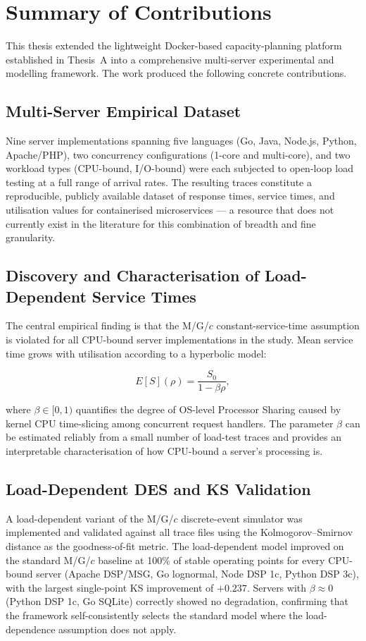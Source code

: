 \section{Summary of Contributions}

This thesis extended the lightweight Docker-based capacity-planning platform established in Thesis~A into a comprehensive multi-server experimental and modelling framework. The work produced the following concrete contributions.

\subsection{Multi-Server Empirical Dataset}

Nine server implementations spanning five languages (Go, Java, Node.js, Python, Apache/PHP), two concurrency configurations (1-core and multi-core), and two workload types (CPU-bound, I/O-bound) were each subjected to open-loop load testing at a full range of arrival rates. The resulting traces constitute a reproducible, publicly available dataset of response times, service times, and utilisation values for containerised microservices — a resource that does not currently exist in the literature for this combination of breadth and fine granularity.

\subsection{Discovery and Characterisation of Load-Dependent Service Times}

The central empirical finding is that the M/G/$c$ constant-service-time assumption is violated for all CPU-bound server implementations in the study. Mean service time grows with utilisation according to a hyperbolic model:

\[
E[S](\rho) = \frac{S_0}{1 - \beta\rho},
\]

where $\beta \in [0, 1)$ quantifies the degree of OS-level Processor Sharing caused by kernel CPU time-slicing among concurrent request handlers. The parameter $\beta$ can be estimated reliably from a small number of load-test traces and provides an interpretable characterisation of how CPU-bound a server's processing is.

\subsection{Load-Dependent DES and KS Validation}

A load-dependent variant of the M/G/$c$ discrete-event simulator was implemented and validated against all trace files using the Kolmogorov–Smirnov distance as the goodness-of-fit metric. The load-dependent model improved on the standard M/G/$c$ baseline at 100\% of stable operating points for every CPU-bound server (Apache DSP/MSG, Go lognormal, Node DSP 1c, Python DSP 3c), with the largest single-point KS improvement of $+0.237$. Servers with $\beta \approx 0$ (Python DSP 1c, Go SQLite) correctly showed no degradation, confirming that the framework self-consistently selects the standard model where the load-dependence assumption does not apply.

